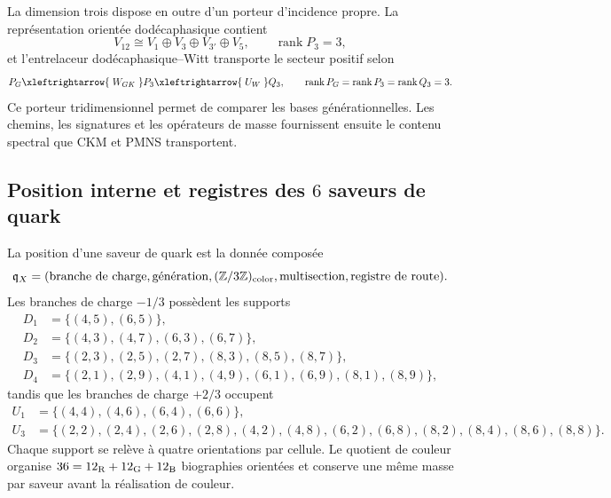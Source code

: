 La dimension trois dispose en outre d'un porteur d'incidence propre. La
représentation orientée dodécaphasique contient
\begin{equation}
 V_{12}\cong V_1\oplus V_3\oplus V_{3'}\oplus V_5,
 \qquad \operatorname{rank}P_3=3,
 \label{eq:descomposicion-rango-tres-generaciones-rev2}
\end{equation}
et l'entrelaceur dodécaphasique--Witt transporte le secteur positif selon
\begin{equation}
 P_G\xleftrightarrow{\;W_{GK}\;}P_3
 \xleftrightarrow{\;U_W\;}Q_3,
 \qquad
 \operatorname{rank}P_G=\operatorname{rank}P_3
 =\operatorname{rank}Q_3=3.
 \label{eq:transporte-rango-tres-generaciones-rev2}
\end{equation}
Ce porteur tridimensionnel permet de comparer les bases générationnelles. Les
chemins, les signatures et les opérateurs de masse fournissent ensuite le contenu
spectral que CKM et PMNS transportent.

\subsection{Position interne et registres des \(6\) saveurs de quark}

La position d'une saveur de quark est la donnée composée
\begin{equation}
 \mathfrak q_X=
 (\text{branche de charge},\text{génération},(\mathbb Z/3\mathbb Z)_{\rm color},
  \text{multisection},\text{registre de route}).
 \label{eq:posicion-quark-compuesta-rev2}
\end{equation}
Les branches de charge \(-1/3\) possèdent les supports
\begin{align}
 D_1&=\{(4,5),(6,5)\},\nonumber\\
 D_2&=\{(4,3),(4,7),(6,3),(6,7)\},\nonumber\\
 D_3&=\{(2,3),(2,5),(2,7),(8,3),(8,5),(8,7)\},\nonumber\\
 D_4&=\{(2,1),(2,9),(4,1),(4,9),(6,1),(6,9),(8,1),(8,9)\},
 \label{eq:soportes-quark-down-rev2}
\end{align}
tandis que les branches de charge \(+2/3\) occupent
\begin{align}
 U_1&=\{(4,4),(4,6),(6,4),(6,6)\},\nonumber\\
 U_3&=\{(2,2),(2,4),(2,6),(2,8),(4,2),(4,8),
       (6,2),(6,8),(8,2),(8,4),(8,6),(8,8)\}.
 \label{eq:soportes-quark-up-rev2}
\end{align}
Chaque support se relève à quatre orientations par cellule. Le quotient de couleur
organise \(36=12_{\rm R}+12_{\rm G}+12_{\rm B}\) biographies orientées et conserve une même
masse par saveur avant la réalisation de couleur.

